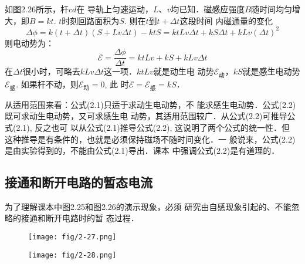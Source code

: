 \begin{figure}[htp]
    \centering
{}
    \caption{}
\end{figure}

如图2.26所示，杆$cd$在
导轨上匀速运动，$L$、$v$均已知．磁感应强度$B$随时间均匀增
大，即$B=kt$. $t$时刻回路面积为$S$. 则在$t$到$t+\Delta t$这段时间
内磁通量的变化 
\[\Delta\phi =k(t+\Delta t)(S+Lv\Delta t)-ktS=ktLv\Delta t
+kS\Delta t+kLv(\Delta t)^2\]
则电动势为：
\[\mathcal{E}=\frac{\Delta\phi}{\Delta t}=ktLv
+kS+kLv\Delta t\]
在$\Delta t$很小时，可略去$kLv\Delta t$这一项．$ktLv$就是动生电
动势$\mathcal{E}_{\text{动}}$，$kS$就是感生电动势$\mathcal{E}_{\text{感}}$. 如果杆不动，则$\mathcal{E}_{\text{动}}=0$, 此
时$\mathcal{E}=\mathcal{E}_{\text{感}}=kS$．

从适用范围来看：公式(2.1)只适于求动生电动势，不
能求感生电动势．公式(2.2)既可求动生电动势，又可求感生电
动势，其适用范围较广．从公式(2.2)可推导公式(2.1), 反之也可
以从公式(2.1)推导公式(2.2), 这说明了两个公式的统一性．但
这种推导是有条件的，也就是必须保持磁场不随时间变化．一
般说来，公式(2.2)是由实验得到的，不能由公式(2.1)导出．课本
中强调公式(2.2)是有道理的．

\subsection{接通和断开电路的暂态电流}
为了理解课本中图2.25和图2.26的演示现象，必须
研究由自感现象引起的、不能忽略的接通和断开电路时的暂
态过程．

\begin{figure}[htp]\centering
    \begin{minipage}[t]{0.48\textwidth}
    \centering
    \texttt{[image: fig/2-27.png]}
    \caption{}
    \end{minipage}
    \begin{minipage}[t]{0.48\textwidth}
    \centering
    \texttt{[image: fig/2-28.png]}
    \caption{}
    \end{minipage}
    \end{figure}

